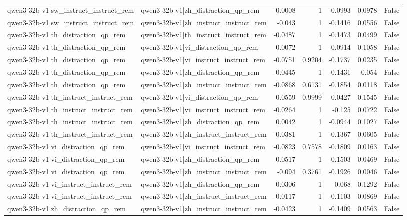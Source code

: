 \begin{table}
\begin{tabular}{l l r r r r l}
qwen3-32b-v1|sw_instruct_instruct_rem & qwen3-32b-v1|zh_distraction_qp_rem & -0.0008 & 1 & -0.0993 & 0.0978 & False \\
qwen3-32b-v1|sw_instruct_instruct_rem & qwen3-32b-v1|zh_instruct_instruct_rem & -0.043 & 1 & -0.1416 & 0.0556 & False \\
qwen3-32b-v1|th_distraction_qp_rem & qwen3-32b-v1|th_instruct_instruct_rem & -0.0487 & 1 & -0.1473 & 0.0499 & False \\
qwen3-32b-v1|th_distraction_qp_rem & qwen3-32b-v1|vi_distraction_qp_rem & 0.0072 & 1 & -0.0914 & 0.1058 & False \\
qwen3-32b-v1|th_distraction_qp_rem & qwen3-32b-v1|vi_instruct_instruct_rem & -0.0751 & 0.9204 & -0.1737 & 0.0235 & False \\
qwen3-32b-v1|th_distraction_qp_rem & qwen3-32b-v1|zh_distraction_qp_rem & -0.0445 & 1 & -0.1431 & 0.054 & False \\
qwen3-32b-v1|th_distraction_qp_rem & qwen3-32b-v1|zh_instruct_instruct_rem & -0.0868 & 0.6131 & -0.1854 & 0.0118 & False \\
qwen3-32b-v1|th_instruct_instruct_rem & qwen3-32b-v1|vi_distraction_qp_rem & 0.0559 & 0.9999 & -0.0427 & 0.1545 & False \\
qwen3-32b-v1|th_instruct_instruct_rem & qwen3-32b-v1|vi_instruct_instruct_rem & -0.0264 & 1 & -0.125 & 0.0722 & False \\
qwen3-32b-v1|th_instruct_instruct_rem & qwen3-32b-v1|zh_distraction_qp_rem & 0.0042 & 1 & -0.0944 & 0.1027 & False \\
qwen3-32b-v1|th_instruct_instruct_rem & qwen3-32b-v1|zh_instruct_instruct_rem & -0.0381 & 1 & -0.1367 & 0.0605 & False \\
qwen3-32b-v1|vi_distraction_qp_rem & qwen3-32b-v1|vi_instruct_instruct_rem & -0.0823 & 0.7578 & -0.1809 & 0.0163 & False \\
qwen3-32b-v1|vi_distraction_qp_rem & qwen3-32b-v1|zh_distraction_qp_rem & -0.0517 & 1 & -0.1503 & 0.0469 & False \\
qwen3-32b-v1|vi_distraction_qp_rem & qwen3-32b-v1|zh_instruct_instruct_rem & -0.094 & 0.3761 & -0.1926 & 0.0046 & False \\
qwen3-32b-v1|vi_instruct_instruct_rem & qwen3-32b-v1|zh_distraction_qp_rem & 0.0306 & 1 & -0.068 & 0.1292 & False \\
qwen3-32b-v1|vi_instruct_instruct_rem & qwen3-32b-v1|zh_instruct_instruct_rem & -0.0117 & 1 & -0.1103 & 0.0869 & False \\
qwen3-32b-v1|zh_distraction_qp_rem & qwen3-32b-v1|zh_instruct_instruct_rem & -0.0423 & 1 & -0.1409 & 0.0563 & False \\
\bottomrule
\end{tabular}
\end{table}
